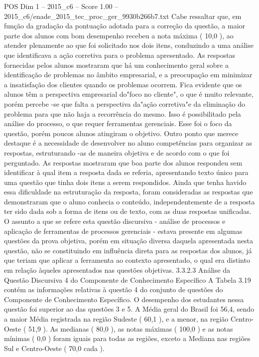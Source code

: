 \begin{textsample}{POS Dim 1 – 2015\_c6 – Score 1.00 – 2015\_c6/enade\_2015\_tec\_proc\_ger\_9930b266b7.txt}
Cabe ressaltar que, em função da gradação da pontuação adotada para a correção da questão, a maior parte dos alunos com bom desempenho recebeu a nota máxima ( 10,0 ), ao atender plenamente ao que foi solicitado nos dois itens, conduzindo a uma análise que identificava a ação corretiva para o problema apresentado.
As respostas fornecidas pelos alunos mostraram que há um conhecimento geral sobre a identificação de problemas no âmbito empresarial, e a preocupação em minimizar a insatisfação dos clientes quando os problemas ocorrem.
Fica evidente que os alunos têm a perspectiva empresarial do"foco no cliente", o que é muito relevante, porém percebe -se que falta a perspectiva da"ação corretiva"e da eliminação do problema para que não haja a recorrência do mesmo.
Isso é possibilitado pela análise do processo, o que requer ferramentas gerenciais.
Esse foi o foco da questão, porém poucos alunos atingiram o objetivo.
Outro ponto que merece destaque é a necessidade de desenvolver no aluno competências para organizar as respostas, estruturando -as de maneira objetiva e de acordo com o que foi perguntado.
As respostas mostraram que boa parte dos alunos respondeu sem identificar à qual item a resposta dada se referia, apresentando texto único para uma questão que tinha dois itens a serem respondidos.
Ainda que tenha havido essa dificuldade na estruturação da resposta, foram consideradas as respostas que demonstraram que o aluno conhecia o conteúdo, independentemente de a resposta ter sido dada sob a forma de itens ou de texto, com as duas respostas unificadas.
O assunto a que se refere esta questão discursiva - análise de processos e aplicação de ferramentas de processos gerenciais - estava presente em algumas questões da prova objetiva, porém em situação diversa daquela apresentada nesta questão, não se constituindo em influência direta para as respostas dos alunos, já que teriam que aplicar a ferramenta ao contexto apresentado, o qual era distinto em relação àqueles apresentados nas questões objetivas. 3.3.2.3 Análise da Questão Discursiva 4 do Componente de Conhecimento Específico A Tabela 3.19 contém as informações relativas à questão 4 do conjunto de questões do Componente de Conhecimento Específico.
O desempenho dos estudantes nessa questão foi superior ao das questões 3 e 5.
A Média geral do Brasil foi 56,4, sendo a maior Média registrada na região Sudeste ( 60,1 ), e a menor, na região Centro-Oeste ( 51,9 ).
As medianas ( 80,0 ), as notas máximas ( 100,0 ) e as notas mínimas ( 0,0 ) foram iguais para todas as regiões, exceto a Mediana nas regiões Sul e Centro-Oeste ( 70,0 cada ).

\end{textsample}
